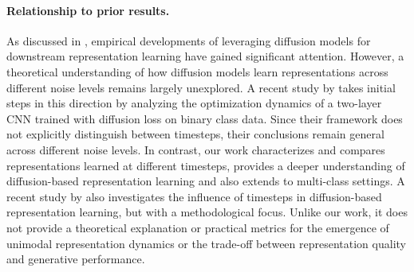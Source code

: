 \begin{itemize}[leftmargin=*]
\end{itemize}


\paragraph{Relationship to prior results.}As discussed in ,
empirical developments of leveraging diffusion models for downstream representation learning have gained significant attention. However, a theoretical understanding of how diffusion models learn representations across different noise levels remains largely unexplored. A recent study by \citep{han2024feature} takes initial steps in this direction by analyzing the optimization dynamics of a two-layer CNN trained with diffusion loss on binary class data. Since their framework does not explicitly distinguish between timesteps, their conclusions remain general across different noise levels. In contrast, our work characterizes and compares representations learned at different timesteps, provides a deeper understanding of diffusion-based representation learning and also extends to multi-class settings. A recent study by \citep{yue2024exploring} also investigates the influence of timesteps in diffusion-based representation learning, but with a methodological focus. Unlike our work, it does not provide a theoretical explanation or practical metrics for the emergence of unimodal representation dynamics or the trade-off between representation quality and generative performance.


